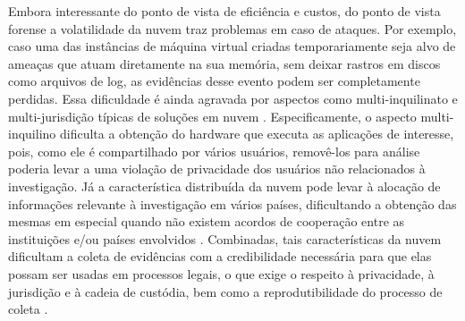 \documentclass[conference]{IEEEtran}
\begin{document}
%
Embora interessante do ponto de vista de eficiência e custos, do ponto de vista forense a volatilidade da nuvem traz problemas em caso de ataques.
%
Por exemplo, caso uma das instâncias de máquina virtual criadas temporariamente seja alvo de ameaças que atuam diretamente na sua memória, sem deixar rastros em discos como arquivos de log, as evidências desse evento podem ser completamente perdidas.
%
Essa dificuldade é ainda agravada por aspectos como multi-inquilinato e multi-jurisdição típicas de soluções em nuvem \cite{Bash2015a}.
%
Especificamente, o aspecto multi-inquilino dificulta a obtenção do hardware que executa as aplicações de interesse, pois, como ele é compartilhado por vários usuários, removê-los para análise poderia levar a uma violação de privacidade dos usuários não relacionados à investigação. 
%
Já a característica distribuída da nuvem pode levar à alocação de informações relevante à investigação em vários países, dificultando a obtenção das mesmas em especial quando não existem acordos de cooperação entre as instituições e/ou países envolvidos \cite{Dykstra2012a}.
%
Combinadas, tais características da nuvem dificultam a coleta de evidências com a credibilidade necessária para que elas possam ser usadas em processos legais,  o que exige o respeito à privacidade, à jurisdição e à cadeia de custódia, bem como a reprodutibilidade do processo de coleta \cite{Rahman2015}.
\end{document}
